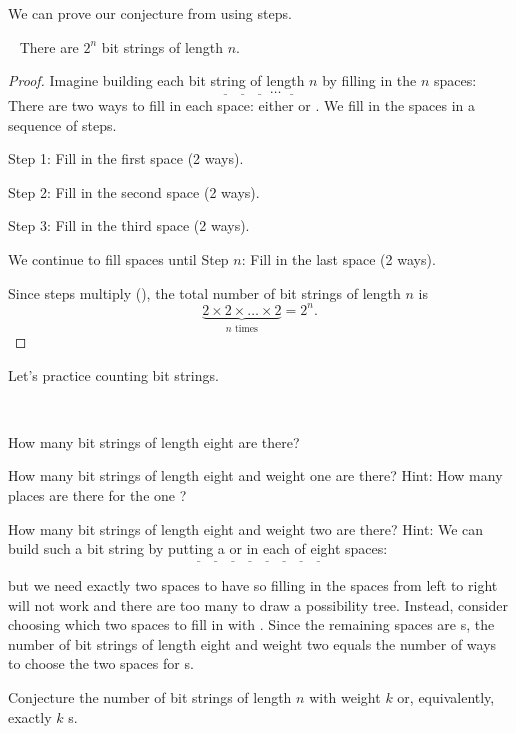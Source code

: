 We can prove our conjecture from  using steps. 

\begin{thm} 
\label{thm_number_bit_strings} 
~
    There are $2^n$ bit strings of length $n$.
    \begin{proof}
        Imagine building each bit string of length $n$ by filling in the $n$ spaces:
            $$\underline{\quad}~\underline{\quad}
        ~\underline{\quad}~\ldots
        ~\underline{\quad}~$$
        There are two ways to fill in each space: either  or . We fill in the spaces in a sequence of steps. 
        
        Step 1: Fill in the first space (2 ways).  
        
        Step 2: Fill in the second space (2 ways).  
        
        Step 3: Fill in the third space (2 ways). 
        
        We continue to fill spaces until Step $n$: Fill in the last space (2 ways).  
        
        Since steps multiply (), the total number of bit strings of length $n$ is 
        $$\underbrace{
        2 \times 2 \times \ldots \times 2}
        _{n \text{ times}}
        = 2^n.$$
    \end{proof}
\end{thm}

Let's practice counting bit strings.

\begin{act} 
\label{act_countingbs}  
~
    \begin{actpart}
        \item How many bit strings of length eight are there?
        \item How many bit strings of length eight and weight one are there?  Hint: How many places are there for the one ?
        \item \label{part_bs_length8_weight2} How many bit strings of length eight and weight two are there?  Hint: We can build such a bit string by putting a  or  in each of eight spaces:
          $$\underline{\quad}~\underline{\quad}~\underline{\quad}~\underline{\quad}~\underline{\quad}~\underline{\quad}~\underline{\quad}~\underline{\quad}~$$

        but we need exactly two spaces to have  so filling in the spaces from left to right will not work and there are too many to draw a possibility tree.  Instead, consider choosing which two spaces to fill in with .  Since the remaining spaces are s, the number of bit strings of length eight and weight two equals the number of ways to choose the two spaces for s.
        \item Conjecture the number of bit strings of length $n$ with weight $k$ or, equivalently, exactly $k$ s.          
    \end{actpart}
\end{act}

